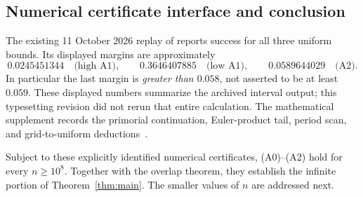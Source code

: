 \subsection{Numerical certificate interface and conclusion}
The existing 11 October 2026 replay of  reports success for all three uniform bounds. Its displayed margins are approximately
\[
0.0245451344\quad\text{(high A1)},\qquad
0.3646407885\quad\text{(low A1)},\qquad
0.0589644029\quad\text{(A2)}.
\]
In particular the last margin is \emph{greater than $0.058$}, not asserted to be at least $0.059$. These displayed numbers summarize the archived interval output; this typesetting revision did not rerun that entire calculation. The mathematical supplement records the primorial continuation, Euler-product tail, period scan, and grid-to-uniform deductions~\cite{TailReplay}.

Subject to these explicitly identified numerical certificates, (A0)--(A2) hold for every $n\ge10^8$. Together with the overlap theorem, they establish the infinite portion of Theorem~\ref{thm:main}. The smaller values of $n$ are addressed next.
